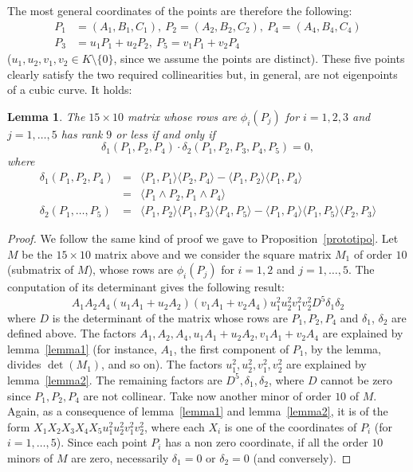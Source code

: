 \documentclass{amsart}
\theoremstyle{plain}
\newtheorem{lemma}[theorem]{Lemma}
\theoremstyle{definition}
\newcommand{\scl}[2]{\langle #1, #2 \rangle}
\begin{document}
The most general coordinates of the points are therefore the following:
\begin{equation}
  \label{5points}
  \begin{split}
P_1 &= (A_1, B_1, C_1), \ P_2 = (A_2, B_2, C_2), \  P_4 = (A_4, B_4, C_4)\\
P_3 &= u_1P_1+u_2P_2, \ P_5 = v_1P_1 +v_2P_4
\end{split}
\end{equation}
($u_1, u_2, v_1, v_2 \in K\setminus\{0\}$, since we assume the points
are distinct).
These five points clearly satisfy the two required collinearities 
but, in general, are not eigenpoints of a cubic curve.
It holds:
\begin{lemma}
  The $15 \times 10$ matrix whose rows are
  $\phi_i(P_j)$ for $i=1, 2, 3$ and $j = 1, \dots, 5$ has rank $9$ or less
  if and only if
  \[
  \delta_1(P_1, P_2, P_4)\cdot \delta_2(P_1, P_2, P_3, P_4, P_5) = 0,
  \]
  where
  \begin{eqnarray}
    \delta_1(P_1, P_2, P_4)  & = & \scl{P_1}{P_1}\scl{P_2}{P_4} -
    \scl{P_1}{P_2}\scl{P_1}{P_4} \label{delta1}\\
    & = &  \scl{P_1 \wedge P_2}{P_1 \wedge P_4} \nonumber \\
    \delta_2(P_1, \dots, P_5) & = &
         \scl{P_1}{P_2}\scl{P_1}{P_3}\scl{P_4}{P_5}-
    \scl{P_1}{P_4}\scl{P_1}{P_5}\scl{P_2}{P_3} \label{delta2}
  \end{eqnarray}
  \label{propFrc}
\end{lemma}

\begin{proof}
  We follow the same kind of proof we gave to Proposition~\ref{prototipo}.
  Let $M$ be the $15 \times 10$ matrix above and we consider the square
  matrix $M_1$ of order $10$ (submatrix of $M$),
  whose rows are $\phi_i(P_j)$ for $i = 1, 2$ and $j = 1, \dots, 5$.
  The conputation of its determinant gives the following result:
  \[
  A_1 A_2 A_4(u_1A_1+u_2A_2)(v_1A_1+v_2A_4)u_1^2u_2^2v_1^2v_2^2 D^5
  \delta_1 \delta_2
  \]
  where $D$ is the determinant of the matrix whose rows are
  $P_1, P_2, P_4$ and $\delta_1$, $\delta_2$ are defined above.
  The factors $A_1, A_2, A_4, u_1A_1+u_2A_2, v_1A_1+v_2A_4$ are explained by
  lemma~\ref{lemma1} (for instance, $A_1$, the first component of $P_1$,
  by the lemma, divides $\det(M_1)$, and so on). The factors
  $u_1^2,u_2^2,v_1^2,v_2^2$ are explained by lemma~\ref{lemma2}. The remaining
  factors are $D^5, \delta_1, \delta_2$, where $D$ cannot be zero since
  $P_1, P_2, P_4$ are not collinear. Take now another minor of order
  $10$ of $M$. Again, as a consequence of lemma~\ref{lemma1} and
  lemma~\ref{lemma2}, it is of the form $X_1X_2X_3X_4X_5 u_1^2u_2^2v_1^2v_2^2$,
  where each $X_i$ is one of the coordinates of $P_i$ (for $i=1, \dots, 5$).
  Since each point $P_i$ has a non zero coordinate, if all the order
  $10$ minors of $M$ are zero, necessarily $\delta_1=0$ or $\delta_2=0$
  (and conversely).
\end{proof}
\end{document}
